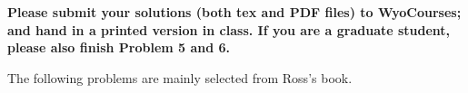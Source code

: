 \documentclass{report}
\begin{document}

\fancyhead{}
\fancyfoot{}


\newcommand{\N}{\mathbb{N}}
\newcommand{\Z}{\mathbb{Z}}
\newcommand{\Q}{\mathbb{Q}}
\newcommand{\R}{\mathbb{R}}
\newcommand{\C}{\mathbb{C}}
\newcommand{\D}{\mathbb{D}}
\newcommand{\<}{\left\langle}
\renewcommand{\>}{\right\rangle}
\renewcommand{\Re}[1]{\text{Re}\ #1}
\renewcommand{\Im}[1]{\text{Im}\ #1}
\renewcommand{\mod}[1]{(\operatorname{mod}#1)}


\noindent
{\bf Please submit your solutions (both tex and PDF files) to WyoCourses; and hand in a printed version in class. If you are a graduate student, please also finish Problem 5 and 6.}

\medskip

The following problems are mainly selected from Ross's book. 
\end{document}
